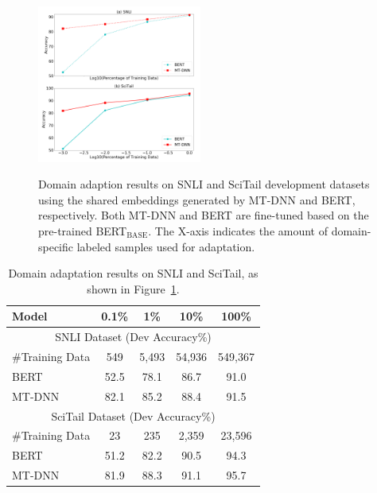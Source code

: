 \begin{figure}[h!]
    \centering
 {
	\includegraphics[width=0.48\textwidth]{fig/da.png}
    }   %
    \caption{\label{fig:domain} Domain adaption results on SNLI and SciTail development datasets using the shared embeddings generated by MT-DNN and BERT, respectively. Both MT-DNN and BERT are fine-tuned based on the pre-trained BERT$_\text{BASE}$. The X-axis indicates the amount of domain-specific labeled samples used for adaptation.}
\end{figure}
\begin{table}[htb!]
	\begin{center}
		\begin{tabular}{@{\hskip1pt}l@{\hskip1pt} |@{\hskip1pt} c |@{\hskip1pt} c |@{\hskip1pt} c | c@{\hskip1pt}}
			\hline \bf Model & 0.1\% & 1\% &10\% & 100\% \\ \hline
            \multicolumn{5}{c}{ SNLI Dataset (Dev Accuracy\%)} \\ \hline
            \#Training Data &549& 5,493& 54,936&549,367 \\ \hline
            BERT &52.5&78.1&86.7 & 91.0 \\ \hline
            MT-DNN &82.1 & 85.2 & 88.4 & 91.5 \\ \hline \hline
\multicolumn{5}{c}{ SciTail Dataset (Dev Accuracy\%)} \\ \hline
            \#Training Data &23& 235& 2,359& 23,596\\ \hline
            BERT &51.2&82.2&90.5 & 94.3 \\ \hline
            MT-DNN &81.9 & 88.3 & 91.1 & 95.7 \\ \hline			
		\end{tabular}
	\end{center}
	\caption{Domain adaptation results on SNLI and SciTail, as shown in Figure~\ref{fig:domain}.  
	}
	\label{tab:domain}
\end{table}

